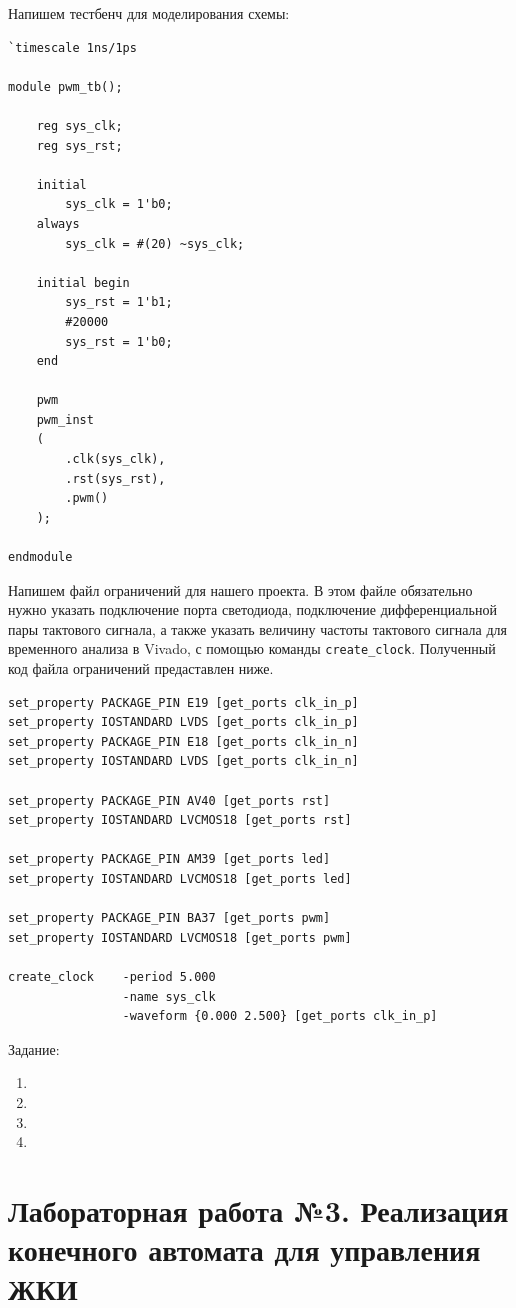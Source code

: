 \documentclass[a4paper,oneside ,14pt]{extreport}
\begin{document}
Напишем тестбенч для моделирования схемы:

\begin{Verbatim}[tabsize=4]
`timescale 1ns/1ps

module pwm_tb();

    reg sys_clk;
    reg sys_rst;

    initial 
        sys_clk = 1'b0;
    always 
        sys_clk = #(20) ~sys_clk;

    initial begin
        sys_rst = 1'b1;
        #20000
        sys_rst = 1'b0;
    end

    pwm
    pwm_inst
    (
        .clk(sys_clk),
        .rst(sys_rst),
        .pwm()
    );

endmodule
\end{Verbatim}

Напишем файл ограничений для нашего проекта. В этом файле обязательно нужно указать подключение порта светодиода, 
подключение дифференциальной пары тактового сигнала, а также указать величину частоты 
тактового сигнала для временного анализа в Vivado, с помощью команды \verb|create_clock|. Полученный код файла ограничений 
предаставлен ниже. 

\begin{Verbatim}[tabsize=4]
set_property PACKAGE_PIN E19 [get_ports clk_in_p]
set_property IOSTANDARD LVDS [get_ports clk_in_p]
set_property PACKAGE_PIN E18 [get_ports clk_in_n]
set_property IOSTANDARD LVDS [get_ports clk_in_n]

set_property PACKAGE_PIN AV40 [get_ports rst]
set_property IOSTANDARD LVCMOS18 [get_ports rst]

set_property PACKAGE_PIN AM39 [get_ports led]
set_property IOSTANDARD LVCMOS18 [get_ports led]

set_property PACKAGE_PIN BA37 [get_ports pwm]
set_property IOSTANDARD LVCMOS18 [get_ports pwm]

create_clock 	-period 5.000 
				-name sys_clk 
			  	-waveform {0.000 2.500} [get_ports clk_in_p]
\end{Verbatim}

\newpage

Задание:

\begin{enumerate}
	\item
	\item 
	\item 
	\item 
\end{enumerate}


\chapter{Лабораторная работа №3. Реализация конечного автомата для управления ЖКИ}
\end{document}
